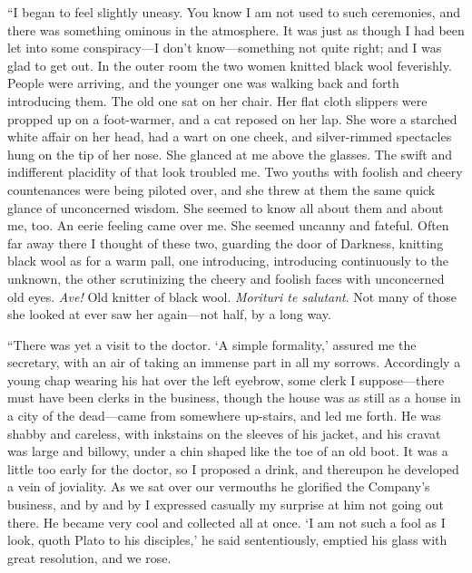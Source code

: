\documentclass[12pt]{report}
\begin{document}
``I began to feel slightly uneasy. You know I am not used to such
ceremonies, and there was something ominous in the atmosphere. It was
just as though I had been let into some conspiracy---I don't
know---something not quite right; and I was glad to get out. In the
outer room the two women knitted black wool feverishly. People were
arriving, and the younger one was walking back and forth introducing
them. The old one sat on her chair. Her flat cloth slippers were propped
up on a foot-warmer, and a cat reposed on her lap. She wore a starched
white affair on her head, had a wart on one cheek, and silver-rimmed
spectacles hung on the tip of her nose. She glanced at me above the
glasses. The swift and indifferent placidity of that look troubled me.
Two youths with foolish and cheery countenances were being piloted over,
and she threw at them the same quick glance of unconcerned wisdom. She
seemed to know all about them and about me, too. An eerie feeling came
over me. She seemed uncanny and fateful. Often far away there I thought
of these two, guarding the door of Darkness, knitting black wool as for
a warm pall, one introducing, introducing continuously to the unknown,
the other scrutinizing the cheery and foolish faces with unconcerned old
eyes. \emph{Ave!} Old knitter of black wool. \emph{Morituri te
salutant}. Not many of those she looked at ever saw her again---not
half, by a long way.

``There was yet a visit to the doctor. `A simple formality,' assured me
the secretary, with an air of taking an immense part in all my sorrows.
Accordingly a young chap wearing his hat over the left eyebrow, some
clerk I suppose---there must have been clerks in the business, though
the house was as still as a house in a city of the dead---came from
somewhere up-stairs, and led me forth. He was shabby and careless, with
inkstains on the sleeves of his jacket, and his cravat was large and
billowy, under a chin shaped like the toe of an old boot. It was a
little too early for the doctor, so I proposed a drink, and thereupon he
developed a vein of joviality. As we sat over our vermouths he glorified
the Company's business, and by and by I expressed casually my surprise
at him not going out there. He became very cool and collected all at
once. `I am not such a fool as I look, quoth Plato to his disciples,' he
said sententiously, emptied his glass with great resolution, and we
rose.
\end{document}
